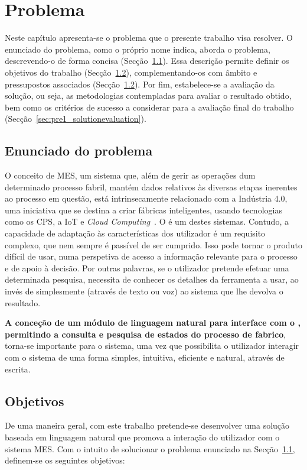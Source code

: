 \chapter{Problema}
\label{chap:pre1}

Neste capítulo apresenta-se o problema que o presente trabalho visa resolver. O enunciado do problema, como o próprio nome indica, aborda o problema, descrevendo-o de forma concisa (Secção~\ref{sec:pre1_problem}). Essa descrição permite definir os objetivos do trabalho (Secção~\ref{sec:pre1_objectives}), complementando-os com âmbito e pressupostos associados (Secção~\ref{sec:pre1_objectives}). Por fim, estabelece-se a avaliação da solução, ou seja, as metodologias contempladas para avaliar o resultado obtido, bem como os critérios de sucesso a considerar para a avaliação final do trabalho (Secção~\ref{sec:pre1_solutionevaluation}).

\section{Enunciado do problema}
\label{sec:pre1_problem}

O conceito de \gls{MES}, um sistema que, além de gerir as operações dum determinado processo fabril, mantém dados relativos às diversas etapas inerentes ao processo em questão, está intrinsecamente relacionado com a Indústria 4.0, uma iniciativa que se destina a criar fábricas inteligentes, usando tecnologias como os \gls{CPS}, a \gls{IoT} e \textit{Cloud Computing}~\parencite{intelligent_manufacturing_context_industry40_review}. O {\productname} é um destes sistemas. Contudo, a capacidade de adaptação às características dos utilizador é um requisito complexo, que nem sempre é passível de ser cumprido. Isso pode tornar o produto difícil de usar, numa perspetiva de acesso a informação relevante para o processo e de apoio à decisão. Por outras palavras, se o utilizador pretende efetuar uma determinada pesquisa, necessita de conhecer os detalhes da ferramenta a usar, ao invés de simplesmente  (através de texto ou voz) ao sistema que lhe devolva o resultado.

\textbf{A conceção de um módulo de linguagem natural para interface com o {\productname}, permitindo a consulta e pesquisa de estados do processo de fabrico}, torna-se importante para o sistema, uma vez que possibilita o utilizador interagir com o sistema de uma forma simples, intuitiva, eficiente e natural, através de escrita.

\section{Objetivos}
\label{sec:pre1_objectives}
De uma maneira geral, com este trabalho pretende-se desenvolver uma solução baseada em linguagem natural que promova a interação do utilizador com o sistema \gls{MES}. Com o intuito de solucionar o problema enunciado na Secção~\ref{sec:pre1_problem}, definem-se os seguintes objetivos:

